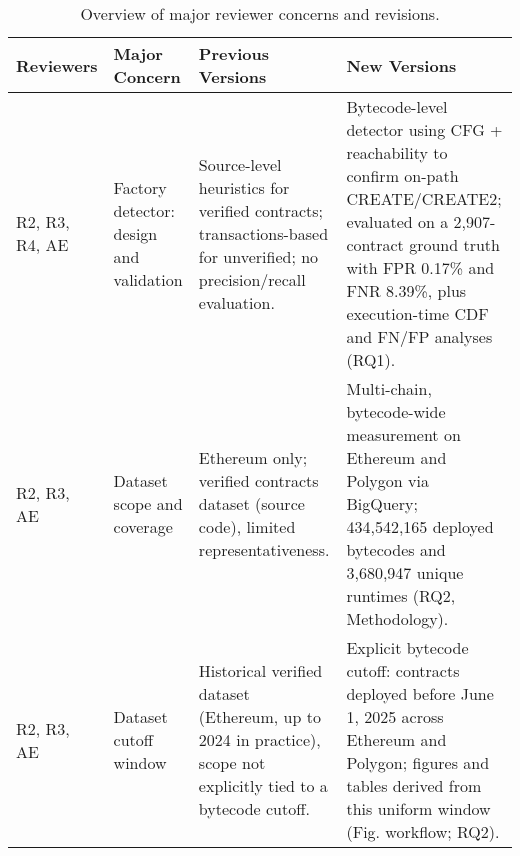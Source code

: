 \begin{table*}
	[t]
	\centering
	\renewcommand{\arraystretch}{1.2}
	\footnotesize
	\caption{Overview of major reviewer concerns and revisions.}
	\label{tab:major-concerns}
	\begin{tabular}{@{}p{1.6cm} p{2cm} p{3.8cm} p{5.5cm}@{}}
		\toprule Reviewers      & Major Concern                           & Previous Versions                                                                                                                                        & New Versions                                                                                                                                                                                                                                                                                                \\
		\midrule R2, R3, R4, AE & Factory detector: design and validation & Source-level heuristics for verified contracts; transactions-based for unverified; no precision/recall evaluation.                                       & Bytecode-level detector using CFG + reachability to confirm on-path CREATE/CREATE2; evaluated on a 2,907-contract ground truth with FPR 0.17\% and FNR 8.39\%, plus execution-time CDF and FN/FP analyses (RQ1).                                                                                            \\
		R2, R3, AE              & Dataset scope and coverage              & Ethereum only; verified contracts dataset (source code), limited representativeness.                                                                     & Multi-chain, bytecode-wide measurement on Ethereum and Polygon via BigQuery; 434,542,165 deployed bytecodes and 3,680,947 unique runtimes (RQ2, Methodology).                                                                                                                                               \\
		R2, R3, AE              & Dataset cutoff window                   & Historical verified dataset (Ethereum, up to 2024 in practice), scope not explicitly tied to a bytecode cutoff.                                          & Explicit bytecode cutoff: contracts deployed before June 1, 2025 across Ethereum and Polygon; figures and tables derived from this uniform window (Fig. workflow; RQ2).                                                                                                                                     \\

\end{tabular}
\end{table*}

